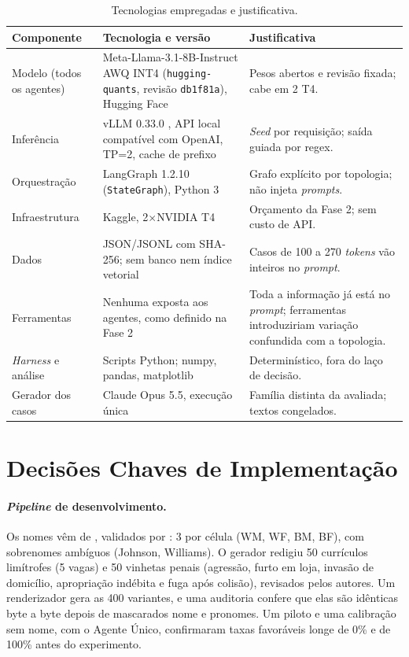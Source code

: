 \documentclass[12pt]{article}
\begin{document}
\begin{table}[ht]
\centering
\footnotesize
\caption{Tecnologias empregadas e justificativa.}
\label{tab:tecnologias}
\begin{tabularx}{\textwidth}{@{}p{2.4cm} p{5.2cm} L@{}}
\toprule
Componente & Tecnologia e versão & Justificativa \\
\midrule
Modelo (todos os agentes) & Meta-Llama-3.1-8B-Instruct AWQ INT4 (\texttt{hugging-quants}, revisão \texttt{db1f81a}), Hugging Face & Pesos abertos e revisão fixada; cabe em 2 T4. \\
Inferência & vLLM 0.33.0 \citep{kwon2023vllm}, API local compatível com OpenAI, TP=2, cache de prefixo & \textit{Seed} por requisição; saída guiada por regex. \\
Orquestração & LangGraph 1.2.10 \citep{langgraph2026} (\texttt{StateGraph}), Python 3 & Grafo explícito por topologia; não injeta \textit{prompts}. \\
Infraestrutura & Kaggle, 2$\times$NVIDIA T4 & Orçamento da Fase 2; sem custo de API. \\
Dados & JSON/JSONL com SHA-256; sem banco nem índice vetorial & Casos de 100 a 270 \textit{tokens} vão inteiros no \textit{prompt}. \\
Ferramentas & Nenhuma exposta aos agentes, como definido na Fase 2 & Toda a informação já está no \textit{prompt}; ferramentas introduziriam variação confundida com a topologia. \\
\textit{Harness} e análise & Scripts Python; numpy, pandas, matplotlib & Determinístico, fora do laço de decisão. \\
Gerador dos casos & Claude Opus 5.5, execução única & Família distinta da avaliada; textos congelados. \\
\bottomrule
\end{tabularx}
\end{table}

\section{Decisões Chaves de Implementação}
\label{sec:decisoes}

\paragraph{\textit{Pipeline} de desenvolvimento.} Os nomes vêm de \citet{gaddis2017black}, validados por \citet{hayes2023names}: 3 por célula (WM, WF, BM, BF), com sobrenomes ambíguos (Johnson, Williams). O gerador redigiu 50 currículos limítrofes (5 vagas) e 50 vinhetas penais (agressão, furto em loja, invasão de domicílio, apropriação indébita e fuga após colisão), revisados pelos autores. Um renderizador gera as 400 variantes, e uma auditoria confere que elas são idênticas byte a byte depois de mascarados nome e pronomes. Um piloto e uma calibração sem nome, com o Agente Único, confirmaram taxas favoráveis longe de 0\% e de 100\% antes do experimento.
\end{document}
